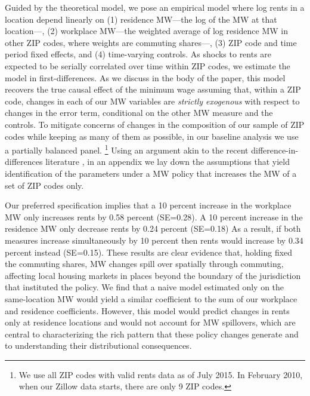Guided by the theoretical model, we pose an empirical model where log rents in 
a location depend linearly on
(1) residence MW---the log of the MW at that location---,
(2) workplace MW---the weighted average of log residence MW in other ZIP codes,
where weights are commuting shares---,
(3)  ZIP code and time period fixed effects,
and 
(4) time-varying controls.
As shocks to rents are expected to be serially correlated over time within ZIP 
codes, we estimate the model in first-differences.
As we discuss in the body of the paper, this model recovers the true causal effect
of the minimum wage assuming that, within a ZIP code, changes in each of our MW 
variables are \textit{strictly exogenous} with respect to changes in the error 
term, conditional on the other MW measure and the controls.
To mitigate concerns of changes in the composition of our sample of ZIP codes 
while keeping as many of them as possible, in our baseline analysis we use a 
partially balanced panel.%
\footnote{We use all ZIP codes with valid rents data as of July 2015. 
	In February 2010, when our Zillow data starts, there are only 9 ZIP codes.}
Using an argument akin to the recent difference-in-differences literature
\parencite[e.g.,][]{CallawaySantAnna2021,CallawayEtAl2021}, 
in an appendix we lay down the assumptions that yield identification of the 
parameters under a MW policy that increases the MW of a set of ZIP codes only.


Our preferred specification implies that a 10 percent increase in the workplace
MW only increases rents by 0.58 percent (SE=0.28).
A 10 percent increase in the residence MW only decrease rents by 0.24 percent
(SE=0.18)
As a result, if both measures increase simultaneously by 10 percent then 
rents would increase by 0.34 percent instead (SE=0.15).
These results are clear evidence that, holding fixed the commuting shares, MW 
changes spill over spatially through commuting, affecting local housing markets 
in places beyond the boundary of the jurisdiction that instituted the policy.
We find that a naive model estimated only on the same-location MW would yield a 
similar coefficient to the sum of our workplace and residence coefficients.
However, this model would predict changes in rents only at residence locations and 
would not account for MW spillovers, which are central to characterizing the rich
pattern that these policy changes generate and to understanding their 
distributional consequences.


